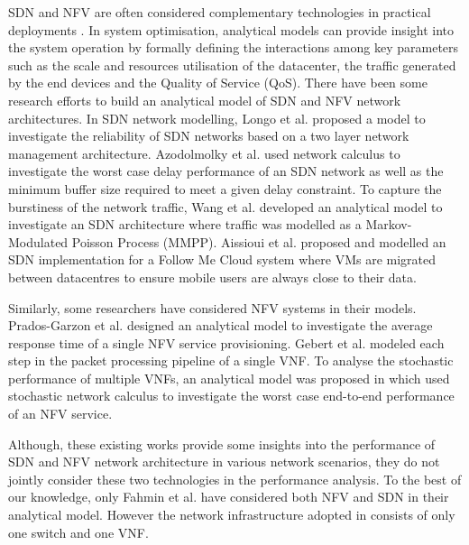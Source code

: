 SDN and NFV are often considered complementary technologies in practical deployments \cite{MatiasGTUJ15}. In system optimisation, analytical models can provide insight into the system operation by formally defining the interactions among key parameters such as the scale and resources utilisation of the datacenter, the traffic generated by the end devices and the Quality of Service (QoS). There have been some research efforts to build an analytical model of SDN and NFV network architectures. In SDN network modelling, Longo et al. \cite{LongoDBS15} proposed a model to investigate the reliability of SDN networks based on a two layer network management architecture. Azodolmolky et al. \cite{AzodolmolkyWY13} used network calculus to investigate the worst case delay performance of an SDN network as well as the minimum buffer size required to meet a given delay constraint. To capture the burstiness of the network traffic, Wang et al. \cite{MiaoMWWH16} developed an analytical model to investigate an SDN architecture where traffic was modelled as a Markov-Modulated Poisson Process (MMPP). Aissioui et al. \cite{AissiouiKGT15} proposed and modelled an SDN implementation for a Follow Me Cloud system where VMs are migrated between datacentres to ensure mobile users are always close to their data.

Similarly, some researchers have considered NFV systems in their models. Prados-Garzon et al. \cite{Prados-GarzonAR17} designed an analytical model to investigate the average response time of a single NFV service provisioning. Gebert et al. \cite{GebertZLST16} modeled each step in the packet processing pipeline of a single VNF. To analyse the stochastic performance of multiple VNFs, an analytical model was proposed in \cite{MiaoMWHZWL19} which used stochastic network calculus to investigate the worst case end-to-end performance of an NFV service. 

Although, these existing works provide some insights into the performance of SDN and NFV network architecture in various network scenarios, they do not jointly consider these two technologies in the performance analysis. To the best of our knowledge, only Fahmin et al. \cite{FahminLHLS17} have considered both NFV and SDN in their analytical model. However the network infrastructure adopted in \cite{FahminLHLS17} consists of only one switch and one VNF.
 
